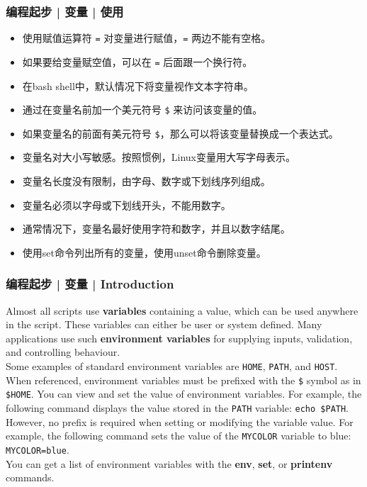 \begin{frame}[fragile]
  \frametitle{编程起步 | 变量 | \alert{使用}}
  \begin{itemize}
    \item 使用赋值运算符 \verb|=| 对变量进行赋值，\verb|=| 两边不能有空格。
    \item 如果要给变量赋空值，可以在 \verb|=| 后面跟一个换行符。
    \item 在bash shell中，默认情况下将变量视作文本字符串。
    \item 通过在变量名前加一个美元符号 \verb|$| 来访问该变量的值。
    \item 如果变量名的前面有美元符号 \verb|$|，那么可以将该变量替换成一个表达式。
    \item 变量名对大小写敏感。按照惯例，Linux变量用大写字母表示。
    \item 变量名长度没有限制，由字母、数字或下划线序列组成。
    \item 变量名必须以字母或下划线开头，不能用数字。
    \item 通常情况下，变量名最好使用字符和数字，并且以数字结尾。
    \item 使用set命令列出所有的变量，使用unset命令删除变量。
  \end{itemize}
\end{frame}

\begin{frame}[fragile]
  \frametitle{编程起步 | 变量 | Introduction}
  Almost all scripts use \textbf{variables} containing a value, which can be used anywhere in the script. These variables can either be user or system defined. Many applications use such \textbf{environment variables} for supplying inputs, validation, and controlling behaviour.\\
  \vspace{0.2cm}
  Some examples of standard environment variables are \verb|HOME|, \verb|PATH|, and \verb|HOST|. When referenced, environment variables must be prefixed with the \verb|$| symbol as in \verb|$HOME|. You can view and set the value of environment variables. For example, the following command displays the value stored in the \verb|PATH| variable: \verb|echo $PATH|.\\
  \vspace{0.2cm}
  However, no prefix is required when setting or modifying the variable value. For example, the following command sets the value of the \verb|MYCOLOR| variable to blue: \verb|MYCOLOR=blue|.\\
  \vspace{0.2cm}
  You can get a list of environment variables with the \textbf{env}, \textbf{set}, or \textbf{printenv} commands.
\end{frame}

